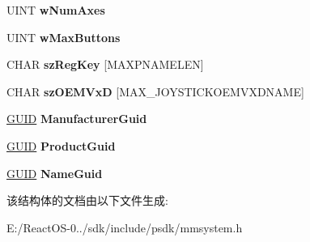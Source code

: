 \begin{DoxyCompactItemize}
\mbox{\label{structtag_j_o_y_c_a_p_s2_a_a07380dc4ef5eb8bcaa6ada7074e7643d}} 
U\+I\+NT {\bfseries w\+Num\+Axes}
\item 
\mbox{\label{structtag_j_o_y_c_a_p_s2_a_a8fc8ec899d568f811824476eae156912}} 
U\+I\+NT {\bfseries w\+Max\+Buttons}
\item 
\mbox{\label{structtag_j_o_y_c_a_p_s2_a_a4937825a567b1e0bd83c4b14c9b29b8d}} 
C\+H\+AR {\bfseries sz\+Reg\+Key} \mbox{[}M\+A\+X\+P\+N\+A\+M\+E\+L\+EN\mbox{]}
\item 
\mbox{\label{structtag_j_o_y_c_a_p_s2_a_ace41173a90aa6ad2124b934d0328e3a3}} 
C\+H\+AR {\bfseries sz\+O\+E\+M\+VxD} \mbox{[}M\+A\+X\+\_\+\+J\+O\+Y\+S\+T\+I\+C\+K\+O\+E\+M\+V\+X\+D\+N\+A\+ME\mbox{]}
\item 
\mbox{\label{structtag_j_o_y_c_a_p_s2_a_a589f83c21c59f1a06778a6254183cf5b}} 
\hyperlink{interface_g_u_i_d}{G\+U\+ID} {\bfseries Manufacturer\+Guid}
\item 
\mbox{\label{structtag_j_o_y_c_a_p_s2_a_a46e7377ecf463078dd28cbc69fc5d922}} 
\hyperlink{interface_g_u_i_d}{G\+U\+ID} {\bfseries Product\+Guid}
\item 
\mbox{\label{structtag_j_o_y_c_a_p_s2_a_a79c6dd1e5a5168b57cef5c1a36e94500}} 
\hyperlink{interface_g_u_i_d}{G\+U\+ID} {\bfseries Name\+Guid}
\end{DoxyCompactItemize}


该结构体的文档由以下文件生成\+:\begin{DoxyCompactItemize}
\item 
E\+:/\+React\+O\+S-\/0../sdk/include/psdk/mmsystem.\+h\end{DoxyCompactItemize}
